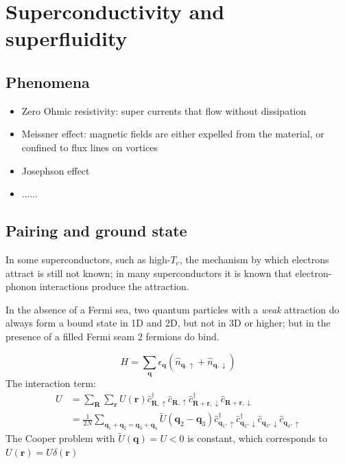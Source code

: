 \documentclass[11pt,letterpaper]{article}
\numberwithin{equation}{section} %
\renewcommand*{\vec}[1]{\bm{#1}}
\newcommand{\spind}{\ensuremath{\downarrow}}
\newcommand{\spinu}{\ensuremath{\uparrow}}
\begin{document}
\section{Superconductivity and superfluidity}
\label{sec:superconductivity_and_superfluidity}
\subsection{Phenomena}
\label{sub:phenomena}
\begin{itemize}
  \item Zero Ohmic resistivity: super currents that flow without dissipation
  \item Meissner effect: magnetic fields are either expelled from the material,
	  or confined to flux lines on vortices 
  \item Josephson effect
  \item ......
\end{itemize}

\subsection{Pairing and ground state}
\label{sub:pairing}
In some superconductors, such as high-$T_c$, the mechanism by which electrons
attract is still not known; in many superconductors it is known that
electron-phonon interactions produce the attraction. 

In the absence of a Fermi sea, two quantum particles with a \emph{weak} attraction
do always form a bound state in 1D and 2D, but not in 3D or higher; but in
the presence of a filled Fermi seam 2 fermions do bind. 

\begin{equation}
	H = \sum_{\vec q}\epsilon_{\vec q} (\hat n_{\vec q, \spinu} + \hat
	n_{\vec q, \spind})
\end{equation}
The interaction term:
\begin{align}
	U &= \sum_{\vec R}\sum_{\vec r} U(\vec r) \hat c_{\vec R ,\spinu}^\dagger \hat
	c_{\vec R ,\spinu}\hat c_{\vec R+\vec r,\spind}^\dagger\hat c_{\vec
	R+\vec r,\spind} \\
	&= \frac 1{2N}\sum_{\vec q_1 +\vec q_2 = \vec q_3 + \vec q_4} 
	\tilde U(\vec q_2 - \vec q_3) \hat c_{\vec q_1,\spinu}^\dagger
	\hat c_{\vec q_2,\spind}^\dagger \hat c_{\vec q_3, \spind}
	\hat c_{\vec q_4,\spinu}
\end{align}
The Cooper problem with $\tilde U(\vec q) = U < 0$ is constant, which
corresponds to $U(\vec r) = U\delta(\vec r)$
\end{document}

